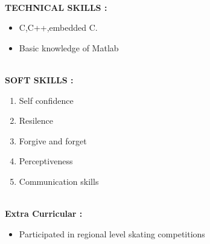 \documentclass{article}
\begin{document}
	
		
\leavevmode\\
	\textbf{TECHNICAL SKILLS :}
	\begin{itemize}	
		\item C,C++,embedded C.
		\item Basic knowledge of Matlab\texttrademark 
	\end{itemize}
		\newpage
		
\leavevmode		\\	
	\textbf{SOFT SKILLS :}
	\begin{enumerate}
	\item Self confidence 
	\item Resilence
	\item Forgive and forget
	\item Perceptiveness
	\item Communication skills 

	\end{enumerate}
	
\leavevmode\\
	\textbf{Extra Curricular :}
	\begin{itemize}
		\item Participated in regional level skating competitions 
		
	\end{itemize}
\end{document}

